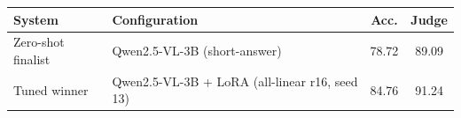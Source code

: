 \begin{tabular}{llcc}
\toprule
System & Configuration & Acc. & Judge\\
\midrule
Zero-shot finalist & Qwen2.5-VL-3B (short-answer) & 78.72 & 89.09\\
Tuned winner & Qwen2.5-VL-3B + LoRA (all-linear r16, seed 13) & 84.76 & 91.24\\
\bottomrule
\end{tabular}
